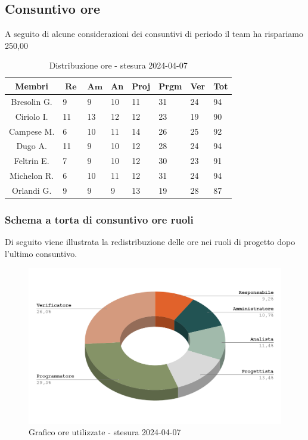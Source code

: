 \documentclass[10pt, a4paper]{article}
\begin{document}
\subsection{Consuntivo ore}
A seguito di alcune considerazioni dei consuntivi di periodo il team ha rispariamo 250,00\texteuro
\renewcommand{\arraystretch}{1.2}
\begin{table}[H]
\begin{tabularx}{\textwidth}{c|X|X|X|X|X|X|X}
        \textbf{Membri} & $\operatorname{\textbf{Re}}$ & $\mathrm{\textbf{Am}}$ & \textbf{An} & \textbf{Proj} & \textbf{Prgm} & \textbf{Ver} & \textbf{Tot} \\
        \hline Bresolin G. & 9 & 9 & 10 & 11 & 31 & 24 & 94 \\
        \hline Ciriolo I. & 11 & 13 & 12 & 12 & 23 & 19 & 90 \\
        \hline Campese M. & 6 & 10 & 11 & 14 & 26 & 25 & 92 \\
        \hline Dugo A.   & 11 & 9 & 10 & 12 & 28 & 24 & 94 \\
        \hline Feltrin E. & 7 & 9 & 10 & 12 & 30 & 23 & 91 \\
        \hline Michelon R. & 6 & 10 & 11 & 12 & 31 & 24 & 94 \\
        \hline Orlandi G. & 9 & 9 & 9 & 13 & 19 & 28 & 87 
    \end{tabularx}
    \caption{Distribuzione ore - stesura 2024-04-07}
    \end{table}
\subsubsection{Schema a torta di consuntivo ore ruoli}
Di seguito viene illustrata la redistribuzione delle ore nei ruoli di progetto dopo l'ultimo consuntivo.
    \begin{figure}[H]
        \centering               
     \includegraphics[width=14cm]{tortaConsuntivoCosti.png}
         \caption{Grafico ore utilizzate - stesura 2024-04-07}
    \end{figure}
\end{document}
